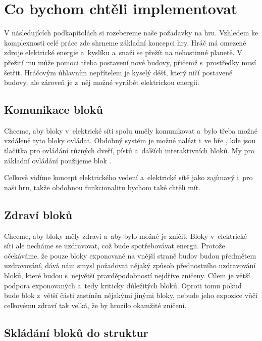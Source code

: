 


\section{Co bychom chtěli implementovat}

V následujících podkapitolách si rozebereme naše požadavky na hru. Vzhledem ke komplexnosti celé práce zde shrneme základní koncepci hry. Hráč má omezené zdroje elektrické energie a~kyslíku a~snaží se přežít na nehostinné planetě. V přežití mu může pomoci třeba postavení nové budovy, přičemž s~prostředky musí šetřit. Hráčovým úhlavním nepřítelem je kyselý déšť, který ničí postavené budovy, ale zároveň je z~něj možné vyrábět elektrickou energii. 







\subsection{Komunikace bloků}

Chceme, aby bloky v~elektrické síti spolu uměly komunikovat a~bylo třeba možné vzdáleně tyto bloky ovládat. Obdobný systém je možné nalézt i~ve hře \SE{}, kde jsou tlačítka pro ovládání různých dveří, pístů a~dalších interaktivních bloků. My pro základní ovládání použijeme blok .


Celkově vidíme koncept elektrického vedení a~elektrické sítě jako zajímavý i~pro naši hru, takže obdobnou funkcionalitu bychom také chtěli mít.



\subsection{Zdraví bloků}
Chceme, aby bloky měly zdraví a~aby bylo možné je zničit. Bloky v~elektrické síti ale necháme se uzdravovat, což bude spotřebovávat energii. Protože očekáváme, že pouze bloky exponované na vnější straně budov budou předmětem uzdravování, dává nám smysl požadovat nějaký způsob přednostního uzdravování bloků, které budou s~největší pravděpodobností nejdříve zničeny. Cílem je větší podpora exponovaných a~tedy kriticky důležitých bloků. Oproti tomu pokud bude blok z~větší části zastíněn nějakými jinými bloky, nebude jeho expozice vůči celkovému zdraví tak velká, že by hrozilo okamžité zničení.

\subsection{Skládání bloků do struktur}

